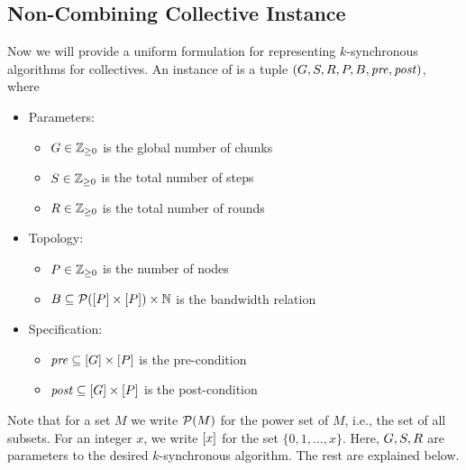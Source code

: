\subsection{Non-Combining Collective Instance}
Now we will provide a uniform formulation for representing
$k$-synchronous algorithms for \broadcasting collectives. An instance
of \collectiveproblem is a tuple
$(G,S,R,P,B,\mathit{pre},\mathit{post})$, where
\begin{itemize}
    \item[] \hspace{-0.5cm}Parameters:
    \begin{itemize}
    \item $G\in\mathbb{Z}_{\geq0}$ is the global number of chunks
    \item $S\in\mathbb{Z}_{\geq0}$ is the total number of steps
    \item $R\in\mathbb{Z}_{\geq0}$ is the total number of rounds
    \end{itemize}
    \item[] \hspace{-0.5cm}Topology:
    \begin{itemize}
    \item $P\in\mathbb{Z}_{\geq0}$ is the number of nodes
    \item
    $B\subseteq\mathcal{P}(\left[P\right]\times\left[P\right])\times\mathbb{N}$
    is the bandwidth relation
    \end{itemize}
    \item[] \hspace{-0.5cm} Specification:
    \begin{itemize}
        \item $\mathit{pre}\subseteq\left[G\right]\times\left[P\right]$ is the
        pre-condition
        \item $\mathit{post}\subseteq\left[G\right]\times\left[P\right]$ is
        the post-condition
    \end{itemize}
\end{itemize}
Note that for a set $M$ we write $\mathcal{P}(M)$ for the power set of
$M$, i.e., the set of all subsets. For an integer $x$, we write
$\left[x\right]$ for the set $\{0, 1, \ldots, x\}$. Here, $G, S,
R$ are parameters to the desired $k$-synchronous algorithm. The
rest are explained below.

